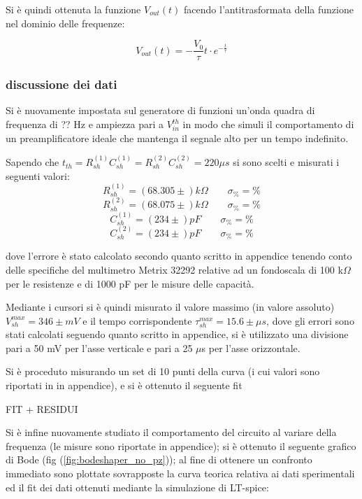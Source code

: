 \documentclass{article}
\begin{document}
Si è quindi ottenuta la funzione $V_{out}(t)$ facendo l'antitrasformata della funzione nel dominio delle frequenze:

$$    V_{out}(t)= - \frac{V_0}{\tau} t \cdot e^{-\frac{t}{\tau}} $$

\subsubsection{discussione dei dati}
Si è nuovamente impostata sul generatore di funzioni un'onda quadra di frequenza di ?? Hz e ampiezza pari a $V_{in}^{th}$
in modo che simuli il comportamento di un preamplificatore ideale che mantenga il segnale alto per un tempo indefinito.

Sapendo che $t_{th}=R_{sh}^{(1)} C_{sh}^{(1)} = R_{sh}^{(2)} C_{sh}^{(2)}=220 \mu s$ si sono scelti e misurati i seguenti valori:
$$
R_{sh}^{(1)} = (68.305  \pm )k\Omega \quad\quad \sigma_{\%}=  \%
$$
$$
R_{sh}^{(2)} = (68.075  \pm )k\Omega \quad\quad \sigma_{\%}=  \%
$$
$$
C_{sh}^{(1)}= (234 \pm  )pF \quad\quad \sigma_{\%}=  \%
$$
$$
C_{sh}^{(2)}= (234 \pm  )pF \quad\quad \sigma_{\%}=  \%
$$

dove l'errore è stato calcolato secondo quanto scritto in appendice tenendo conto delle specifiche del multimetro Metrix 32292 relative ad un fondoscala di 
100 k$\Omega$ per le resistenze e di 1000 pF per le misure delle capacità.

Mediante i cursori si è quindi misurato il valore massimo (in valore assoluto) $V_{sh}^{max}=346 \pm mV$ e il tempo corrispondente $\tau_{sh}^{max}=15.6 \pm \mu s$, dove gli errori 
sono stati calcolati seguendo quanto scritto in appendice, si è utilizzato una divisione pari a 50 mV per l'asse verticale e pari a 25 $\mu$s per l'asse 
orizzontale.

Si è proceduto misurando un set di 10 punti della curva (i cui valori sono riportati in in appendice), e si è ottenuto il seguente fit 
 
FIT + RESIDUI

Si è infine nuovamente studiato il comportamento del circuito al variare della frequenza (le misure sono riportate in appendice); si è ottenuto il seguente grafico di Bode (fig (\ref{fig:bodeshaper_no_pz}));
al fine di ottenere un confronto immediato sono plottate sovrapposte la curva teorica relativa ai dati sperimentali ed il fit dei dati ottenuti mediante la simulazione di LT-spice:
\end{document}
